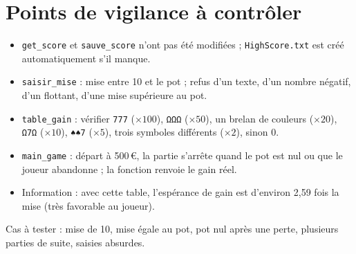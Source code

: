 \documentclass[10pt,a4paper]{article}
\begin{document}
\section*{Points de vigilance à contrôler}
\begin{itemize}
\item \texttt{get\_score} et \texttt{sauve\_score} n'ont pas été modifiées ; \texttt{HighScore.txt} est créé automatiquement s'il manque.
\item \texttt{saisir\_mise} : mise entre 10 et le pot ; refus d'un texte, d'un nombre négatif, d'un flottant, d'une mise supérieure au pot.
\item \texttt{table\_gain} : vérifier \texttt{777} ($\times 100$), \texttt{ΩΩΩ} ($\times 50$), un brelan de couleurs ($\times 20$), \texttt{Ω7Ω} ($\times 10$), \texttt{♠♠7} ($\times 5$), trois symboles différents ($\times 2$), sinon 0.
\item \texttt{main\_game} : départ à 500\,\euro, la partie s'arrête quand le pot est nul ou que le joueur abandonne ; la fonction renvoie le gain réel.
\item Information : avec cette table, l'espérance de gain est d'environ 2,59 fois la mise (très favorable au joueur).
\end{itemize}
\smallskip
Cas à tester : mise de 10, mise égale au pot, pot nul après une perte, plusieurs parties de suite, saisies absurdes.
\end{document}

